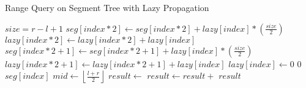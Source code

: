 \begin{algorithm}[H]
    \caption{Range Query on Segment Tree with Lazy Propagation}
    \begin{algorithmic}
            \State $size = r - l + 1$
                \State $seg[index*2] \gets seg[index*2] + lazy[index] * \left( \frac{size}{2} \right)$
                \State $lazy[index*2] \gets lazy[index*2] + lazy[index]$
                \State $seg[index*2+1] \gets seg[index*2+1] + lazy[index] * \left( \frac{size}{2} \right)$
                \State $lazy[index*2+1] \gets lazy[index*2+1] + lazy[index]$
                \State $lazy[index] \gets 0$
            \EndIf
        \EndProcedure
                \State \Return $0$
            \EndIf
                \State \Return $seg[index]$
            \EndIf
            \State {}
            \State $mid \gets \left\lfloor \frac{l + r}{2} \right\rfloor$
            \State $result \gets$ 
            \State $result \gets result +$ 
            \State \Return $result$
        \EndProcedure
    \end{algorithmic}
\end{algorithm}